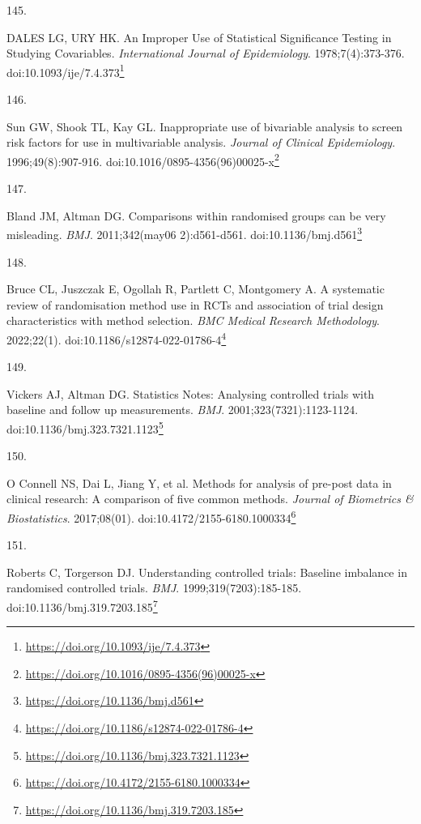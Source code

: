 \documentclass[
  a4paper,
]{book}
\newlength{\cslhangindent}
\newlength{\csllabelwidth}
\newlength{\cslentryspacingunit} %
\newenvironment{CSLReferences}[2] %
 {%
  \setlength{\parindent}{0pt}
  \ifodd #1
  \let\oldpar\par
  \def\par{\hangindent=\cslhangindent\oldpar}
  \fi
  \setlength{\parskip}{#2\cslentryspacingunit}
 }%
 {}
\newcommand{\CSLLeftMargin}[1]{\parbox[t]{\csllabelwidth}{#1}}
\newcommand{\CSLRightInline}[1]{\parbox[t]{\linewidth - \csllabelwidth}{#1}\break}
\renewcommand{\href}[2]{#2\footnote{\url{#1}}}
\begin{document}
\begin{CSLReferences}{0}{0}
\leavevmode{}%
\CSLLeftMargin{145. }%
\CSLRightInline{DALES LG, URY HK. An Improper Use of Statistical Significance Testing in Studying Covariables. \emph{International Journal of Epidemiology}. 1978;7(4):373-376. doi:\href{https://doi.org/10.1093/ije/7.4.373}{10.1093/ije/7.4.373}}

\leavevmode{}%
\CSLLeftMargin{146. }%
\CSLRightInline{Sun GW, Shook TL, Kay GL. Inappropriate use of bivariable analysis to screen risk factors for use in multivariable analysis. \emph{Journal of Clinical Epidemiology}. 1996;49(8):907-916. doi:\href{https://doi.org/10.1016/0895-4356(96)00025-x}{10.1016/0895-4356(96)00025-x}}

\leavevmode{}%
\CSLLeftMargin{147. }%
\CSLRightInline{Bland JM, Altman DG. Comparisons within randomised groups can be very misleading. \emph{BMJ}. 2011;342(may06 2):d561-d561. doi:\href{https://doi.org/10.1136/bmj.d561}{10.1136/bmj.d561}}

\leavevmode{}%
\CSLLeftMargin{148. }%
\CSLRightInline{Bruce CL, Juszczak E, Ogollah R, Partlett C, Montgomery A. A systematic review of randomisation method use in RCTs and association of trial design characteristics with method selection. \emph{BMC Medical Research Methodology}. 2022;22(1). doi:\href{https://doi.org/10.1186/s12874-022-01786-4}{10.1186/s12874-022-01786-4}}

\leavevmode{}%
\CSLLeftMargin{149. }%
\CSLRightInline{Vickers AJ, Altman DG. Statistics Notes: Analysing controlled trials with baseline and follow up measurements. \emph{BMJ}. 2001;323(7321):1123-1124. doi:\href{https://doi.org/10.1136/bmj.323.7321.1123}{10.1136/bmj.323.7321.1123}}

\leavevmode{}%
\CSLLeftMargin{150. }%
\CSLRightInline{O Connell NS, Dai L, Jiang Y, et al. Methods for analysis of pre-post data in clinical research: A comparison of five common methods. \emph{Journal of Biometrics \& Biostatistics}. 2017;08(01). doi:\href{https://doi.org/10.4172/2155-6180.1000334}{10.4172/2155-6180.1000334}}

\leavevmode{}%
\CSLLeftMargin{151. }%
\CSLRightInline{Roberts C, Torgerson DJ. Understanding controlled trials: Baseline imbalance in randomised controlled trials. \emph{BMJ}. 1999;319(7203):185-185. doi:\href{https://doi.org/10.1136/bmj.319.7203.185}{10.1136/bmj.319.7203.185}}


\end{CSLReferences}
\end{document}
